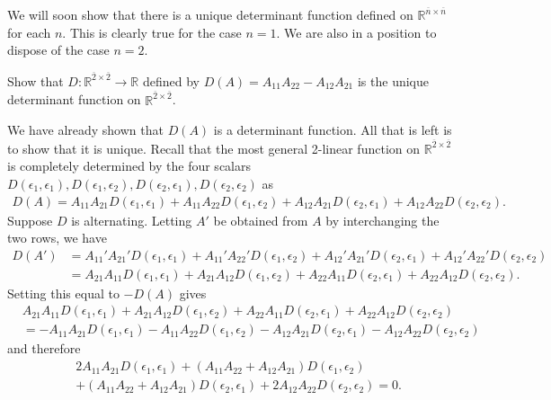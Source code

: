 \documentclass[12pt,letterpaper,reqno]{article}
\numberwithin{equation}{section}
\begin{document}
We will soon show that there is a unique determinant function defined on $\mathbb{R}^{\overline{n} \times \overline{n}}$ for each $n$. This is clearly true for the case $n=1$. We are also in a position to dispose of the case $n=2$.

\begin{exercise}
Show that $D:\mathbb{R}^{\overline{2} \times \overline{2}} \to \mathbb{R}$ defined by $D(A)=A_{11}A_{22}-A_{12}A_{21}$ is the unique determinant function on $\mathbb{R}^{\overline{2} \times \overline{2}}$.
\end{exercise}

{\color{red} 
We have already shown that $D(A)$ is a determinant function. All that is left is to show that it is unique. Recall that the most general 2-linear function on $\mathbb{R}^{\overline{2} \times \overline{2}}$ is completely determined by the four scalars $D(\epsilon_1,\epsilon_1), D(\epsilon_1,\epsilon_2), D(\epsilon_2,\epsilon_1), D(\epsilon_2,\epsilon_2)$ as
\begin{align*}
	D(A)=A_{11}A_{21}D(\epsilon_1,\epsilon_1)+A_{11}A_{22}D(\epsilon_1,\epsilon_2)+A_{12}A_{21}D(\epsilon_2,\epsilon_1)+A_{12}A_{22}D(\epsilon_2,\epsilon_2).
\end{align*}
Suppose $D$ is alternating. Letting $A'$ be obtained from $A$ by interchanging the two rows, we have
\begin{align*}
D(A')&=A_{11}'A_{21}'D(\epsilon_1,\epsilon_1)+A_{11}'A_{22}'D(\epsilon_1,\epsilon_2)+A_{12}'A_{21}'D(\epsilon_2,\epsilon_1)+A_{12}'A_{22}'D(\epsilon_2,\epsilon_2) \\
	&=A_{21}A_{11}D(\epsilon_1,\epsilon_1)+A_{21}A_{12}D(\epsilon_1,\epsilon_2)+A_{22}A_{11}D(\epsilon_2,\epsilon_1)+A_{22}A_{12}D(\epsilon_2,\epsilon_2).
\end{align*}
Setting this equal to $-D(A)$ gives
\begin{align*}
	&A_{21}A_{11}D(\epsilon_1,\epsilon_1)+A_{21}A_{12}D(\epsilon_1,\epsilon_2)+A_{22}A_{11}D(\epsilon_2,\epsilon_1)+A_{22}A_{12}D(\epsilon_2,\epsilon_2)\\
	&=-A_{11}A_{21}D(\epsilon_1,\epsilon_1)-A_{11}A_{22}D(\epsilon_1,\epsilon_2)-A_{12}A_{21}D(\epsilon_2,\epsilon_1)-A_{12}A_{22}D(\epsilon_2,\epsilon_2)
\end{align*}
and therefore
\begin{align*}
	&2A_{11}A_{21}D(\epsilon_1,\epsilon_1)+(A_{11}A_{22}+A_{12}A_{21})D(\epsilon_1,\epsilon_2)\\
	&+(A_{11}A_{22}+A_{12}A_{21})D(\epsilon_2,\epsilon_1)+2A_{12}A_{22}D(\epsilon_2,\epsilon_2)=0.

\end{align*}}
\end{document}
